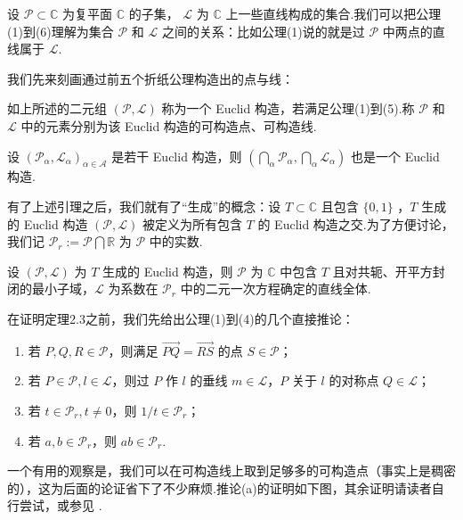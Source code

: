 设 $\mathcal{P}\subset\mathbb{C}$ 为复平面 $\mathbb{C}$ 的子集， $\mathcal{L}$ 为 $\mathbb{C}$ 上一些直线构成的集合.我们可以把公理(1)到(6)理解为集合 $\mathcal{P}$ 和 $\mathcal{L}$ 之间的关系：比如公理(1)说的就是过 $\mathcal{P}$ 中两点的直线属于 $\mathcal{L}$.

我们先来刻画通过前五个折纸公理构造出的点与线：

\begin{definition}
    如上所述的二元组 $(\mathcal{P},\mathcal{L})$ 称为一个 Euclid 构造，若满足公理(1)到(5).称 $\mathcal{P}$ 和 $\mathcal{L}$ 中的元素分别为该 Euclid 构造的可构造点、可构造线.
\end{definition}

\begin{lemma}
    设 $(\mathcal{P}_\alpha,\mathcal{L}_\alpha)_{\alpha\in\mathcal{A}}$ 是若干 Euclid 构造，则 $(\bigcap_\alpha \mathcal{P}_\alpha,\bigcap_\alpha \mathcal{L}_\alpha)$ 也是一个 Euclid 构造.
\end{lemma}

有了上述引理之后，我们就有了“生成”的概念：设 $T\subset\mathbb{C}$ 且包含 $\{0,1\}$ ，$T$ 生成的 Euclid 构造 $(\mathcal{P},\mathcal{L})$ 被定义为所有包含 $T$ 的 Euclid 构造之交.为了方便讨论，我们记 $\mathcal{P}_r:=\mathcal{P}\bigcap\mathbb{R}$ 为 $\mathcal{P}$ 中的实数.

\begin{theorem}
    设 $(\mathcal{P},\mathcal{L})$ 为 $T$ 生成的 Euclid 构造，则 $\mathcal{P}$ 为 $\mathbb{C}$ 中包含 $T$ 且对共轭、开平方封闭的最小子域，$\mathcal{L}$ 为系数在 $\mathcal{P}_r$ 中的二元一次方程确定的直线全体.
\end{theorem}

在证明定理2.3之前，我们先给出公理(1)到(4)的几个直接推论：

\begin{enumerate}[wide,itemindent=2em,label=(\alph*)]
\item 若 $P,Q,R\in\mathcal{P}$，则满足 $\overrightarrow{PQ}=\overrightarrow{RS}$ 的点 $S\in\mathcal{P}$；
\item 若 $P\in\mathcal{P},l\in\mathcal{L}$，则过 $P$ 作 $l$ 的垂线 $m\in\mathcal{L}$，$P$ 关于 $l$ 的对称点 $Q\in\mathcal{L}$；
\item 若 $t\in\mathcal{P}_r,t\neq 0$，则 $1/t\in\mathcal{P}_r$；
\item 若 $a,b\in\mathcal{P}_r$，则 $ab\in\mathcal{P}_r$.
\end{enumerate}

一个有用的观察是，我们可以在可构造线上取到足够多的可构造点（事实上是稠密的），这为后面的论证省下了不少麻烦.推论(a)的证明如下图，其余证明请读者自行尝试，或参见 \cite{Hesi}.

